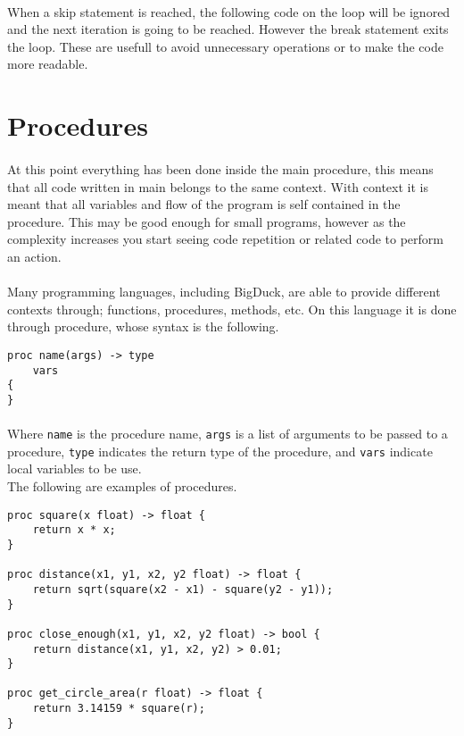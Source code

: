 \paragraph{} When a skip statement is reached, the following code on the loop
will be ignored and the next iteration is going to be reached. However the
break statement exits the loop. These are usefull to avoid unnecessary 
operations or to make the code more readable.

\newpage

\section{Procedures}

\paragraph{} At this point everything has been done inside the main procedure,
this means that all code written in main belongs to the same context. With
context it is meant that all variables and flow of the program is self contained
in the procedure. This may be good enough for small programs, however as the
complexity increases you start seeing code repetition or related code to perform
an action.

\paragraph{} Many programming languages, including BigDuck, are able to
provide different contexts through; functions, procedures, methods, etc. On this
language it is done through procedure, whose syntax is the following.

\begin{verbatim}
proc name(args) -> type
    vars
{
}
\end{verbatim}

\paragraph{} Where \texttt{name} is the procedure name, \texttt{args} is a list
of arguments to be passed to a procedure, \texttt{type} indicates the return
type of the procedure, and \texttt{vars} indicate local variables to be use.\\

\noindent
The following are examples of procedures.

\begin{verbatim}
proc square(x float) -> float {
    return x * x;
}

proc distance(x1, y1, x2, y2 float) -> float {
    return sqrt(square(x2 - x1) - square(y2 - y1));
}

proc close_enough(x1, y1, x2, y2 float) -> bool {
    return distance(x1, y1, x2, y2) > 0.01;
}

proc get_circle_area(r float) -> float {
    return 3.14159 * square(r);
}
\end{verbatim}

